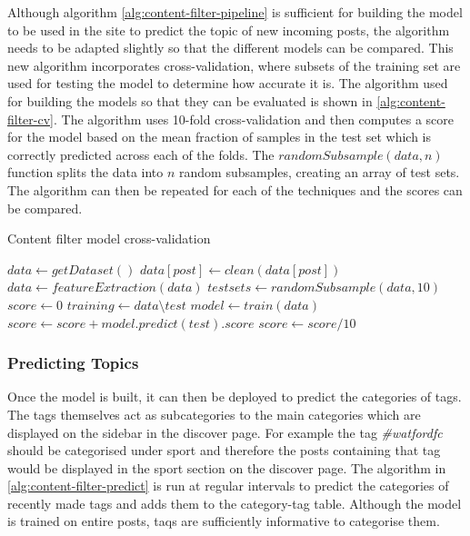 Although algorithm \ref{alg:content-filter-pipeline} is sufficient for building the model to be used in the site to predict the topic of new incoming posts, the algorithm needs to be adapted slightly so that the different models can be compared. This new algorithm incorporates cross-validation, where subsets of the training set are used for testing the model to determine how accurate it is. The algorithm used for building the models so that they can be evaluated is shown in \ref{alg:content-filter-cv}. The algorithm uses 10-fold cross-validation and then computes a score for the model based on the mean fraction of samples in the test set which is correctly predicted across each of the folds. The $randomSubsample(data,n)$ function splits the data into $n$ random subsamples, creating an array of test sets. The algorithm can then be repeated for each of the techniques and the scores can be compared.

\begin{algorithm}
\caption{Content filter model cross-validation}
\label{alg:content-filter-cv}
\begin{algorithmic}[1]
\State $data\gets getDataset()$
	\State $data[post]\gets clean(data[post])$
\EndFor
\State $data\gets featureExtraction(data)$
\State $testsets\gets randomSubsample(data, 10)$
\State $score\gets 0$
	\State $training\gets data\setminus test$
	\State $model\gets train(data)$
	\State $score\gets score + model.predict(test).score$
\EndFor
\State $score\gets score/10$
\end{algorithmic}
\end{algorithm}

\subsubsection{Predicting Topics}
Once the model is built, it can then be deployed to predict the categories of tags. The tags themselves act as subcategories to the main categories which are displayed on the sidebar in the discover page. For example the tag \textit{\#watfordfc} should be categorised under sport and therefore the posts containing that tag would be displayed in the sport section on the discover page. The algorithm in \ref{alg:content-filter-predict} is run at regular intervals to predict the categories of recently made tags and adds them to the category-tag table. Although the model is trained on entire posts, taqs are sufficiently informative to categorise them.

